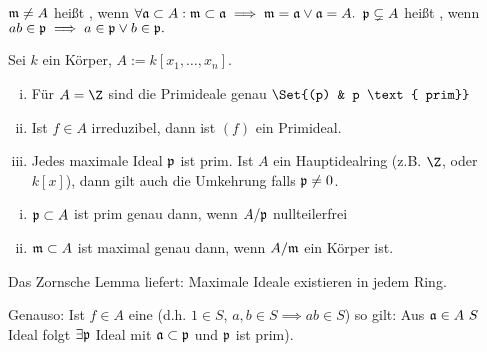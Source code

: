 \begin{df}
    $\frak m \neq A$ heißt , wenn
    \begin{math}
        \forall \frak a \subset A: \frak m \subset \frak a \implies \frak m = \frak a \lor \frak a = A.
    \end{math}
    $\frak p \subsetneq A$ heißt , wenn
    \begin{math}
        ab \in \frak p \implies a \in \frak p \lor b \in \frak p.
    \end{math}
\end{df}

\begin{ex}
    Sei $k$ ein Körper, $A := k[x_1, \dotsc, x_n]$.
    \begin{enumerate}[i)]
        \item
            Für $A = \Z$ sind die Primideale genau
            \begin{math}
                \Set{(p) & p \text{ prim}}
            \end{math}
        \item
            Ist $f \in A$ irreduzibel, dann ist $(f)$ ein Primideal.
        \item
            Jedes maximale Ideal $\frak p$ ist prim.
            Ist $A$ ein Hauptidealring (z.B. $\Z$, oder $k[x]$), dann gilt auch die Umkehrung falls $\frak p \neq 0$.
    \end{enumerate}
\end{ex}

\begin{st}
    \begin{enumerate}[i)]
        \item
            $\frak p \subset A$ ist prim genau dann, wenn $A / \frak p$ nullteilerfrei
        \item
            $\frak m \subset A$ ist maximal genau dann, wenn $A / \frak m$ ein Körper ist.
    \end{enumerate}
\end{st}

\begin{nt}
    Das Zornsche Lemma liefert: Maximale Ideale existieren in jedem Ring.
    
    Genauso: Ist $f \in A$ eine  (d.h. $1 \in S$, $a,b \in S \implies ab \in S$) so gilt:
    Aus $\frak a \in A \ S$ Ideal folgt $\exists \frak p$ Ideal mit $\frak a \subset \frak p$ und $\frak p$ ist prim).
\end{nt}

